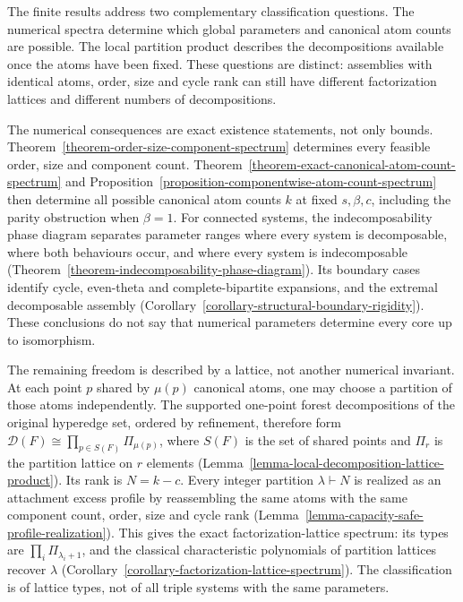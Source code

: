 \documentclass[a4paper,11pt,reqno]{amsart}
\theoremstyle{plain}
\theoremstyle{definition}
\theoremstyle{remark}
\begin{document}
The finite results address two complementary classification questions.
The numerical spectra determine which global parameters and canonical atom
counts are possible.  The local partition product describes the
decompositions available once the atoms have been fixed.  These questions
are distinct: assemblies with identical atoms, order, size and cycle rank
can still have different factorization lattices and different numbers of
decompositions.

The numerical consequences are exact existence statements, not only bounds.
Theorem~\ref{theorem-order-size-component-spectrum} determines every feasible
order, size and component count.
Theorem~\ref{theorem-exact-canonical-atom-count-spectrum} and
Proposition~\ref{proposition-componentwise-atom-count-spectrum} then determine
all possible canonical atom counts \(k\) at fixed \(s,\beta,c\), including
the parity obstruction when \(\beta=1\).  For connected systems, the
indecomposability phase diagram
separates parameter ranges where every system is decomposable, where both
behaviours occur, and where every system is indecomposable
(Theorem~\ref{theorem-indecomposability-phase-diagram}).  Its boundary cases
identify cycle, even-theta and complete-bipartite expansions, and the
extremal decomposable assembly
(Corollary~\ref{corollary-structural-boundary-rigidity}).  These conclusions
do not say that numerical parameters determine every core up to isomorphism.

The remaining freedom is described by a lattice, not another numerical
invariant.  At each point \(p\) shared by \(\mu(p)\) canonical atoms, one may
choose a partition of those atoms independently.  The supported one-point
forest decompositions of the original hyperedge set, ordered by refinement,
therefore form \(\mathcal D(F)\cong\prod_{p\in S(F)}\Pi_{\mu(p)}\), where
\(S(F)\) is the set of shared points and \(\Pi_r\) is the partition lattice
on \(r\) elements (Lemma~\ref{lemma-local-decomposition-lattice-product}).
Its rank is \(N=k-c\).  Every integer partition \(\lambda\vdash N\) is
realized as an attachment excess profile by reassembling the same atoms
with the same component count, order, size and cycle rank
(Lemma~\ref{lemma-capacity-safe-profile-realization}).  This gives the exact
factorization-lattice spectrum: its types are
\(\prod_i\Pi_{\lambda_i+1}\), and the classical characteristic polynomials
of partition lattices \citep[Chapter~3]{stanley2012} recover \(\lambda\)
(Corollary~\ref{corollary-factorization-lattice-spectrum}).  The classification
is of lattice types,
not of all triple systems with the same parameters.
\end{document}
